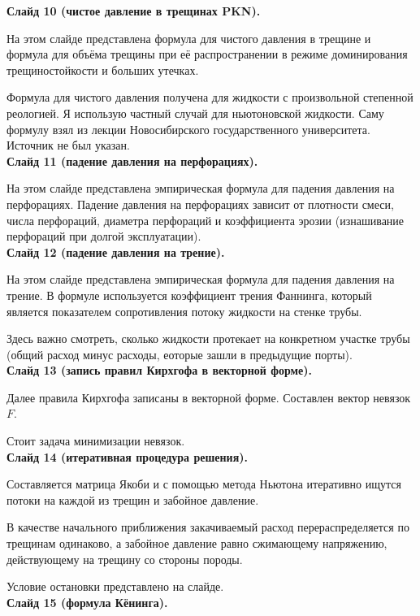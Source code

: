 \documentclass[a4paper, 12pt]{article}
\begin{document}
\textbf{Слайд 10 (чистое давление в трещинах PKN).}

На этом слайде представлена формула для чистого давления в трещине и формула для объёма трещины при её распространении в режиме доминирования трещиностойкости и больших утечках.

Формула для чистого давления получена для жидкости с произвольной степенной реологией.
Я использую частный случай для ньютоновской жидкости.
Саму формулу взял из лекции Новосибирского государственного университета.
Источник не был указан.\\

\textbf{Слайд 11 (падение давления на перфорациях).}

На этом слайде представлена эмпирическая формула для падения давления на перфорациях.
Падение давления на перфорациях зависит от плотности смеси, числа перфораций, диаметра перфораций и коэффициента эрозии (изнашивание перфораций при долгой эксплуатации).\\

\textbf{Слайд 12 (падение давления на трение).}

На этом слайде представлена эмпирическая формула для падения давления на трение.
В формуле используется коэффициент трения Фаннинга, который является показателем сопротивления потоку жидкости на стенке трубы.

Здесь важно смотреть, сколько жидкости протекает на конкретном участке трубы (общий расход минус расходы, еоторые зашли в предыдущие порты).\\

\textbf{Слайд 13 (запись правил Кирхгофа в векторной форме).}

Далее правила Кирхгофа записаны в векторной форме.
Составлен вектор невязок $F$.

Стоит задача минимизации невязок.\\

\textbf{Слайд 14 (итеративная процедура решения).}

Составляется матрица Якоби и с помощью метода Ньютона итеративно ищутся потоки на каждой из трещин и забойное давление.

В качестве начального приближения закачиваемый расход перераспределяется по трещинам одинаково, а забойное давление равно сжимающему напряжению, действующему на трещину со стороны породы.

Условие остановки представлено на слайде.\\

\textbf{Слайд 15 (формула Кёнинга).}
\end{document}
